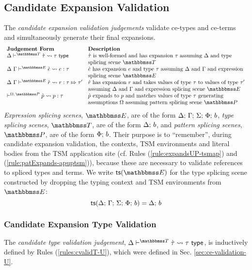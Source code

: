 {{{{\subsection{Candidate Expansion Validation}\label{sec:ce-validation-UP}
The \emph{candidate expansion validation judgements} validate ce-types and ce-terms and simultaneously generate their final expansions.
\[\begin{array}{ll}
\textbf{Judgement Form} & \textbf{Description}\\
\cvalidT{\Delta}{\tscenev}{\ctau}{\tau} & \text{$\ctau$ is well-formed and has expansion $\tau$ assuming $\Delta$ and type}\\
& \text{splicing scene $\tscenev$}\\
\cvalidE{\Delta}{\Gamma}{\escenev}{\ce}{e}{\tau} & \text{$\ce$ has expansion $e$ and type $\tau$ assuming $\Delta$ and $\Gamma$ and expression}\\
& \text{splicing scene $\escenev$}\\
\cvalidR{\Delta}{\Gamma}{\escenev}{\crv}{r}{\tau}{\tau'} & \text{$\crv$ has expansion $r$ and takes values of type $\tau$ to values of type $\tau'$}\\
& \text{assuming $\Delta$ and $\Gamma$ and expression splicing scene $\escenev$}\\
\cvalidP{\pctx}{\pscenev}{\cpv}{p}{\tau} & \text{$\cpv$ expands to $p$ and matches values of type $\tau$ generating}\\
& \text{assumptions $\pctx$ assuming pattern splicing scene $\pscenev$}
\end{array}\]
\emph{Expression splicing scenes}, $\escenev$, are of the form $\Delta;\,\Gamma;\,\Sigma;\,\Phi;\,b$, \emph{type splicing scenes}, $\tscenev$, are of the form $\Delta;\,b$, and \emph{pattern splicing scenes}, $\pscenev$, are of the form $\Phi;\,b$. Their purpose is to ``remember'', during candidate expansion validation, the contexts, TSM environments and literal bodies from the TSM application site (cf. Rules (\ref{rule:expandsUP-tsmap}) and (\ref{rule:patExpands-apuptsm})), because these are necessary to validate references to spliced types and terms. We write $\tsfrom{\escenev}$ for the type splicing scene constructed by dropping the typing context and TSM environments from $\escenev$:
\[\mathsf{ts}(\Delta;\,\Gamma;\,\Sigma;\,\Phi;\,b) = \Delta;\,b\]

\subsubsection{Candidate Expansion Type Validation}
The \emph{candidate type validation judgement}, $\cvalidT{\Delta}{\tscenev}{\ctau}{\tau}$, is inductively defined by Rules (\ref{rules:cvalidT-U}), which were defined in Sec. \ref{sec:ce-validation-U}.

}}}}
